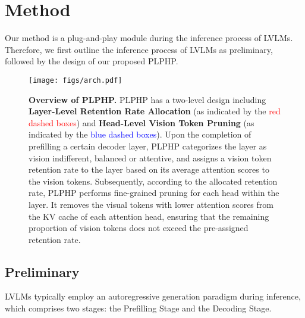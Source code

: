 \section{Method}\label{sec::method}

Our method is a plug-and-play module during the inference process of LVLMs. Therefore, we first outline the inference process of LVLMs as preliminary, followed by the design of our proposed PLPHP.

\begin{figure*}
	\centering
		\texttt{[image: figs/arch.pdf]}
	\caption{\textbf{Overview of PLPHP.} PLPHP has a two-level design including \textbf{Layer-Level Retention Rate Allocation} (as indicated by the \textcolor{red}{red dashed boxes}) and \textbf{Head-Level Vision Token Pruning} (as indicated by the \textcolor{blue}{blue dashed boxes}). Upon the completion of prefilling a certain decoder layer, PLPHP categorizes the layer as vision indifferent, balanced or attentive, and assigns a vision token retention rate to the layer based on its average attention scores to the vision tokens. Subsequently, according to the allocated retention rate, PLPHP performs fine-grained pruning for each head within the layer. It removes the visual tokens with lower attention scores from the KV cache of each attention head, ensuring that the remaining proportion of vision tokens does not exceed the pre-assigned retention rate.}
        \vspace{-0.5cm}
		\label{fig:arch}
\end{figure*}


\subsection{Preliminary}

LVLMs typically employ‌ an autoregressive generation paradigm during inference, which comprises two stages: the Prefilling Stage and the Decoding Stage.

